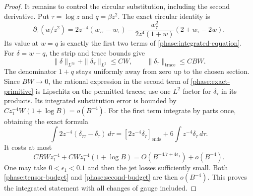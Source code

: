 \begin{proof}
It remains to control the circular substitution, including the second
derivative.  Put $\tau=\log z$ and $q=\beta z^2$.  The exact circular
identity is
\begin{equation}
 \partial_\tau(w/z^2)
 =2z^{-4}(w_{\tau\tau}-w_\tau)
 -\frac{w_\tau^2}{2z^4(1+w)}(2+w_\tau-2w).
 \label{phase:exact-primitive}
\end{equation}
Its value at $w=q$ is exactly the first two terms of
\eqref{phase:integrated-equation}.
For $\delta=w-q$, the strip and trace bounds give
\[
 \|\delta\|_{L^\infty}+\|\delta_\tau\|_{L^2}\le CW,
       \qquad \|\delta_\tau\|_{\mathrm{trace}}\le CBW.
\]
The denominator $1+q$ stays uniformly away from zero up to the chosen
section.  Since $BW\to0$, the rational expression in the second term
of \eqref{phase:exact-primitive} is Lipschitz on the permitted traces;
use one $L^2$ factor for $\delta_\tau$ in its products.  Its integrated
substitution error is bounded by
$Cz_1^{-4}W(1+\log B)=o(B^{-4})$.
For the first term integrate by parts once, obtaining the exact formula
\begin{equation}
 \int 2z^{-4}(\delta_{\tau\tau}-\delta_\tau)\,d\tau
       =[2z^{-4}\delta_\tau]_{\mathrm{ends}}
                   +6\int z^{-4}\delta_\tau\,d\tau.
 \label{phase:ibp}
\end{equation}
It costs at most
\begin{equation}
 C BWz_1^{-4}+C Wz_1^{-4}(1+\log B)
              =O(B^{-4.7+4\epsilon_1})+o(B^{-4}).
 \label{phase:second-budget}
\end{equation}
One may take $0<\epsilon_1<0.1$ and then the jet losses sufficiently
small.  Both \eqref{phase:tensor-budget} and
\eqref{phase:second-budget} are then $o(B^{-4})$.
This proves the integrated statement with all changes of gauge included.
\end{proof}

